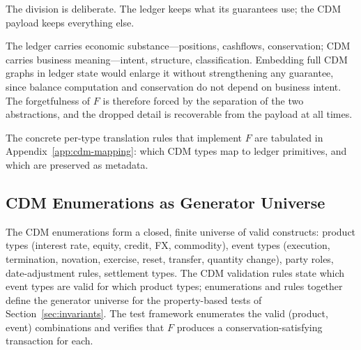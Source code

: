 The division is deliberate. The ledger keeps what its guarantees use; the CDM payload keeps everything else.

\begin{principle}
The ledger carries economic substance---positions, cashflows, conservation; CDM carries business meaning---intent, structure, classification. Embedding full CDM graphs in ledger state would enlarge it without strengthening any guarantee, since balance computation and conservation do not depend on business intent. The forgetfulness of $F$ is therefore forced by the separation of the two abstractions, and the dropped detail is recoverable from the payload at all times.
\end{principle}

The concrete per-type translation rules that implement $F$ are tabulated in Appendix~\ref{app:cdm-mapping}: which CDM types map to ledger primitives, and which are preserved as metadata.

\subsection{CDM Enumerations as Generator Universe}

The CDM enumerations form a closed, finite universe of valid constructs: product types (interest rate, equity, credit, FX, commodity), event types (execution, termination, novation, exercise, reset, transfer, quantity change), party roles, date-adjustment rules, settlement types. The CDM validation rules state which event types are valid for which product types; enumerations and rules together define the generator universe for the property-based tests of Section~\ref{sec:invariants}. The test framework enumerates the valid (product, event) combinations and verifies that $F$ produces a conservation-satisfying transaction for each.


